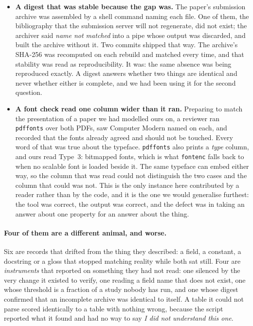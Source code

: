\begin{itemize}
\item \textbf{A digest that was stable because the gap was.} The paper's
  submission archive was assembled by a shell command naming each file. One of
  them, the bibliography that the submission server will not regenerate, did not
  exist; the archiver said \emph{name not matched} into a pipe whose output was
  discarded, and built the archive without it. Two commits shipped that way. The
  archive's SHA-256 was recomputed on each rebuild and matched every time, and
  that stability was read as reproducibility. It was: the same absence was being
  reproduced exactly. A digest answers whether two things are identical and
  never whether either is complete, and we had been using it for the second
  question.
\item \textbf{A font check read one column wider than it ran.} Preparing to
  match the presentation of a paper we had modelled ours on, a reviewer ran
  \texttt{pdffonts} over both PDFs, saw Computer Modern named on each, and
  recorded that the fonts already agreed and should not be touched. Every word
  of that was true about the typeface. \texttt{pdffonts} also prints a
  \emph{type} column, and ours read Type~3: bitmapped fonts, which is what
  \texttt{fontenc} falls back to when no scalable font is loaded beside it. The
  same typeface can embed either way, so the column that was read could not
  distinguish the two cases and the column that could was not. This is the only
  instance here contributed by a reader rather than by the code, and it is the
  one we would generalise furthest: the tool was correct, the output was
  correct, and the defect was in taking an answer about one property for an
  answer about the thing.
\end{itemize}

\paragraph{Four of them are a different animal, and worse.} Six are records
that drifted from the thing they described: a field, a constant, a docstring or
a gloss that stopped matching reality while both sat still. Four are
\emph{instruments} that reported on something they had not read: one silenced by
the very change it existed to verify, one reading a field name that does not
exist, one whose threshold is a fraction of a study nobody has run, and one
whose digest confirmed that an incomplete archive was identical to itself. A table it could not parse scored identically to a table with nothing
wrong, because the script reported what it found and had no way to say
\emph{I did not understand this one}.

